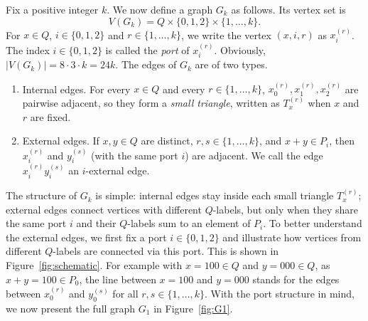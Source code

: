 \documentclass[12pt]{article}
\begin{document}
Fix a positive integer $k$. We now define a  graph $G_k$ as follows. Its vertex set is
\[
V(G_k)=Q\times\{0,1,2\}\times\{1,\ldots,k\}.
\]
For $x\in Q$, $i\in \{0,1,2\}$ and $r\in\{1,\ldots,k\}$, 
we write the vertex $(x,i,r)$ as $x_i^{(r)}$. The index $i\in\{0,1,2\}$ is called the \emph{port} of  $x_i^{(r)}$. Obviously, 
$|V(G_k)|=8\cdot 3\cdot k=24k$.
The edges of $G_k$ are of two types.%

\begin{enumerate}[label=(\roman*)]
\item Internal edges. For every $x\in Q$ and every $r\in\{1,\ldots,k\}$,  $x_0^{(r)}, x_1^{(r)},  x_2^{(r)}$ are pairwise adjacent, so they form  a \emph{small triangle}, written as $T_x^{(r)}$ when $x$ and $r$ are fixed. 

\item External edges. If $x,y\in Q$ are distinct, $r,s\in\{1,\ldots,k\}$, and $x+y\in P_i$, then $x_i^{(r)}$ and $y_i^{(s)}$ (with the same port $i$)  are adjacent. We call the edge $x_i^{(r)}y_i^{(s)}$ an $i$-external edge.
%
\end{enumerate}

The structure of $G_k$ is simple: internal edges stay inside each small triangle $T_x^{(r)}$; external edges connect vertices with different $Q$-labels, but only when they share the same port $i$ and their $Q$-labels sum to an element of $P_i$. 
To better understand the external edges, we first fix a port $i \in \{0,1,2\}$ and illustrate how vertices from different $Q$-labels are connected via this port. This is shown in Figure~\ref{fig:schematic}. For example with $x=100\in Q$ and $y=000\in Q$, as $x+y=100\in P_0$, the line between $x=100$ and $y=000$ stands for the edges between $x_0^{(r)}$ and $y_0^{(s)}$ for all $r,s\in \{1,\dots,k\}$.
With the port structure in mind, we now present the full graph $G_1$ in Figure~\ref{fig:G1}.

\end{document}
